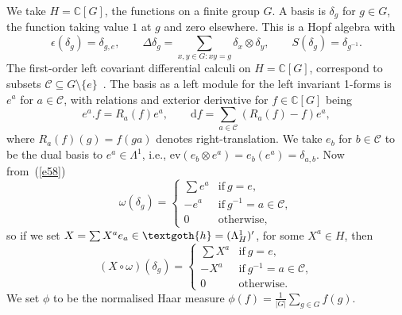 \documentclass[10pt,a4paper]{amsart}
\numberwithin{equation}{section}
\newcommand{\ev}{\mathrm{ev}}
\newcommand{\extd}{\mathrm{d}}
\newcommand{\tens}{\mathop{\otimes}}
\newcommand{\C}{\mathbb{C}}
\newcommand{\<}{\langle}
\renewcommand{\>}{\rangle}
\begin{document}
 We take $ H=\C[G] $, the functions on a finite group $ G $. A basis is $ \delta_{g} $ for $ g\in G $, the function taking value $ 1 $ at $ g $ and zero elsewhere. This is a Hopf algebra with
 \[\epsilon (\delta_{g})=\delta_{g,e}, \qquad \Delta \delta_{g} = \sum_{ x,y\in G \colon xy=g}\delta_{x}\tens \delta_{y}, \qquad S(\delta_{g})=\delta_{g^{-1}}.\]
 The first-order left covariant differential calculi on $ H\!=\!\C[G]$, correspond to subsets $\mathcal{C}\!\subseteq\! G\setminus\{e\}$~\cite{KB}. The basis as a left module for the left invariant 1-forms is~$e^a$ for $a\in\mathcal{C}$, with relations and exterior derivative for $f\in \C[G]$ being
 \[ e^a.f=R_a(f) e^a,\qquad \extd
 f=\sum_{a\in {\mathcal{C}}}(R_a(f)-f) e^a,\]
 where $R_a(f)(g)=f(g a)$ denotes right-translation. We take $ e_{b} $ for $ b \in \mathcal{C} $ to be the dual basis to $ e^{a} \in \Lambda^{1} $, i.e., $ \ev (e_{b}\tens e^{a} )=e_{b} (e^{a})= \delta_{a,b} $. Now from~(\ref{e58})
\begin{equation*}
\omega(\delta_{g})=\begin{cases}
\sum e^{a} & \mbox{if} \ g=e, \\
- e^{a} & \mbox{if}\ g^{-1}=a \in \mathcal{C},\\
0 & \mbox{otherwise},
\end{cases}
\end{equation*}
so if we set $ X=\sum X^{a} e_{a} \in \textgoth{h}=(\Lambda_{H}^{1})'$, for some $ X^{a}\in H $, then{\samepage
 \begin{equation}\label{e51}
(X \circ \omega)(\delta_{g})=\begin{cases}
\sum X^{a} & \mbox{if} \ g=e, \\
- X^{a} & \mbox{if}\ g^{-1}=a \in \mathcal{C},\\
0 & \mbox{otherwise}.
\end{cases}
\end{equation}
 We set $ \phi $ to be the normalised Haar measure $ \phi(f)=\frac{1}{|G|}\sum_{g\in G}f (g) $.}
\end{document}
